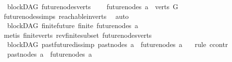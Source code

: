 \begin{isabellebody}
\endisatagproof
{\isafoldproof}%
%
\isadelimproof
\isanewline
%
\endisadelimproof
\isanewline
\isanewline
{}\isamarkupfalse%
\ {\isacharparenleft}{\kern0pt}\ blockDAG{\isacharparenright}{\kern0pt}\ future{\isacharunderscore}{\kern0pt}nodes{\isacharunderscore}{\kern0pt}verts{\isacharcolon}{\kern0pt}\ \isanewline
\ \ \ {\isachardoublequoteopen}future{\isacharunderscore}{\kern0pt}nodes\ a\ {\isasymsubseteq}\ verts\ G{\isachardoublequoteclose}\isanewline
%
\isadelimproof
\ \ %
\endisadelimproof
%
\isatagproof
{}\isamarkupfalse%
\ future{\isacharunderscore}{\kern0pt}nodes{\isachardot}{\kern0pt}simps\ reachable{}{\isacharunderscore}{\kern0pt}in{\isacharunderscore}{\kern0pt}verts\ \isamarkupfalse%
\ auto%
\endisatagproof
{\isafoldproof}%
%
\isadelimproof
\isanewline
%
\endisadelimproof
\isanewline
{}\isamarkupfalse%
\ {\isacharparenleft}{\kern0pt}\ blockDAG{\isacharparenright}{\kern0pt}\ finite{\isacharunderscore}{\kern0pt}future{\isacharcolon}{\kern0pt}\ {\isachardoublequoteopen}finite\ {\isacharparenleft}{\kern0pt}future{\isacharunderscore}{\kern0pt}nodes\ a{\isacharparenright}{\kern0pt}{\isachardoublequoteclose}\isanewline
%
\isadelimproof
\ \ %
\endisadelimproof
%
\isatagproof
{}\isamarkupfalse%
\ {\isacharparenleft}{\kern0pt}metis\ finite{\isacharunderscore}{\kern0pt}verts\ rev{\isacharunderscore}{\kern0pt}finite{\isacharunderscore}{\kern0pt}subset\ future{\isacharunderscore}{\kern0pt}nodes{\isacharunderscore}{\kern0pt}verts{\isacharparenright}{\kern0pt}%
\endisatagproof
{\isafoldproof}%
%
\isadelimproof
\isanewline
%
\endisadelimproof
\isanewline
{}\isamarkupfalse%
\ {\isacharparenleft}{\kern0pt}\ blockDAG{\isacharparenright}{\kern0pt}\ past{\isacharunderscore}{\kern0pt}future{\isacharunderscore}{\kern0pt}dis{\isacharbrackleft}{\kern0pt}simp{\isacharbrackright}{\kern0pt}{\isacharcolon}{\kern0pt}\ {\isachardoublequoteopen}past{\isacharunderscore}{\kern0pt}nodes\ a\ {\isasyminter}\ future{\isacharunderscore}{\kern0pt}nodes\ a\ {\isacharequal}{\kern0pt}\ {\isacharbraceleft}{\kern0pt}{\isacharbraceright}{\kern0pt}{\isachardoublequoteclose}\isanewline
%
\isadelimproof
%
\endisadelimproof
%
\isatagproof
{}\isamarkupfalse%
\ {\isacharparenleft}{\kern0pt}rule\ ccontr{\isacharparenright}{\kern0pt}\isanewline
\ \ \isamarkupfalse%
\ {\isachardoublequoteopen}{\isasymnot}\ past{\isacharunderscore}{\kern0pt}nodes\ a\ {\isasyminter}\ future{\isacharunderscore}{\kern0pt}nodes\ a\ {\isacharequal}{\kern0pt}\ {\isacharbraceleft}{\kern0pt}{\isacharbraceright}{\kern0pt}{\isachardoublequoteclose}\isanewline

\end{isabellebody}
